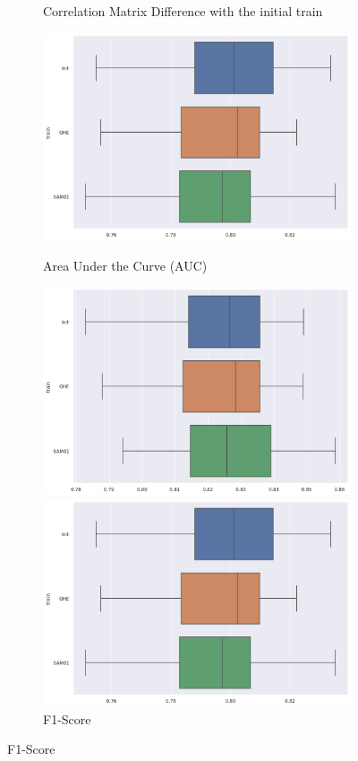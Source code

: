 \documentclass{article}
\theoremstyle{definition}
\begin{document}
\begin{figure}[H]
\begin{subfigure}[b]{0.24\textwidth}
         \caption{Correlation Matrix Difference with the initial train}
         \quad
         \includegraphics[width=\textwidth]{imgs/Adults/Bal/Boxplot_AUC.png}
         \caption{Area Under the Curve (AUC)}
         \quad
         \includegraphics[width=\textwidth]{imgs/Adults/Bal/Boxplot_F1S.png}
         \caption{F1-Score}
         \quad
         \includegraphics[width=\textwidth]{imgs/Adults/Bal/Boxplot_BACC.png}

\end{subfigure}
\end{figure}
\end{document}

